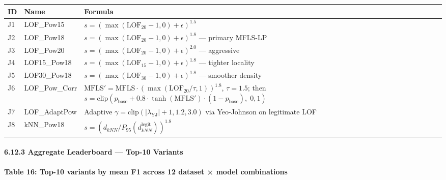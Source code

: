 \documentclass[
  11pt,
]{article}
\newcounter{none} %
\begin{document}
{\def\LTcaptype{none} %
\begin{longtable}[]{@{}
  >{\raggedright\arraybackslash}p{}
  >{\raggedright\arraybackslash}p{}
  >{\raggedright\arraybackslash}p{}@{}}
\toprule\noalign{}
\begin{minipage}[b]{\linewidth}\raggedright
ID
\end{minipage} & \begin{minipage}[b]{\linewidth}\raggedright
Name
\end{minipage} & \begin{minipage}[b]{\linewidth}\raggedright
Formula
\end{minipage} \\
\midrule\noalign{}
\endhead
\bottomrule\noalign{}
\endlastfoot
J1 & LOF\_Pow15 &
\(s = (\max(\text{LOF}_{20}-1, 0) + \epsilon)^{1.5}\) \\
J2 & LOF\_Pow18 & \(s = (\max(\text{LOF}_{20}-1, 0) + \epsilon)^{1.8}\)
— primary MFLS-LP \\
J3 & LOF\_Pow20 & \(s = (\max(\text{LOF}_{20}-1, 0) + \epsilon)^{2.0}\)
— aggressive \\
J4 & LOF15\_Pow18 &
\(s = (\max(\text{LOF}_{15}-1, 0) + \epsilon)^{1.8}\) — tighter
locality \\
J5 & LOF30\_Pow18 &
\(s = (\max(\text{LOF}_{30}-1, 0) + \epsilon)^{1.8}\) — smoother
density \\
J6 & LOF\_Pow\_Corr &
\(\text{MFLS}' = \text{MFLS} \cdot (\max(\text{LOF}_{20}/\tau, 1))^{1.8}\),
\(\tau=1.5\); then
\(s = \text{clip}(p_{\text{base}} + 0.8 \cdot \tanh(\text{MFLS}') \cdot (1-p_{\text{base}}),\; 0, 1)\) \\
J7 & LOF\_AdaptPow & Adaptive
\(\gamma = \text{clip}(|\lambda_{\text{YJ}}|+1, 1.2, 3.0)\) via
Yeo-Johnson on legitimate LOF \\
J8 & kNN\_Pow18 &
\(s = (d_{kNN}/P_{95}(d_{kNN}^{\text{legit}}))^{1.8}\) \\
\end{longtable}
}

\paragraph{6.12.3 Aggregate Leaderboard — Top-10
Variants}\label{aggregate-leaderboard-top-10-variants}

\textbf{Table 16: Top-10 variants by mean F1 across 12 dataset × model
combinations}
\end{document}
